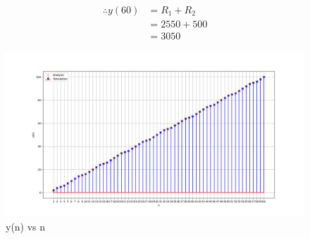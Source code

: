 \documentclass[journal,12pt,twocolumn]{IEEEtran}
\begin{document}
	\begin{align}
		\therefore y(60)&= R_1 + R_2 \\
		 &= 2550 + 500\\
		 &= 3050
	\end{align}
	\begin{figure}[ht]
		\includegraphics[width = \columnwidth]{figs/fig1}
		\caption{y(n) vs n}
		\centering
		\label{fig: fig1}
	\end{figure}
\end{document}
